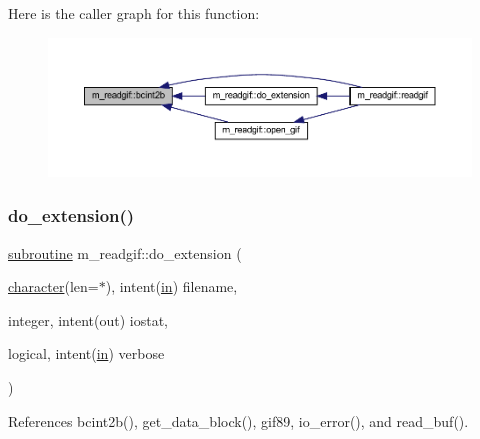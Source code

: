 Here is the caller graph for this function\+:
\nopagebreak
\begin{figure}[H]
\begin{center}
\leavevmode
\includegraphics[width=350pt]{namespacem__readgif_a38594ce718f97f844771250edcd5e496_icgraph}
\end{center}
\end{figure}
\mbox{\label{namespacem__readgif_a93c5f69ee5054ba2c10ed17b8ab53f6b}} 
\subsubsection{\texorpdfstring{do\+\_\+extension()}{do\_extension()}}
{\footnotesize\ttfamily \hyperlink{M__stopwatch_83_8txt_acfbcff50169d691ff02d4a123ed70482}{subroutine} m\+\_\+readgif\+::do\+\_\+extension (\begin{DoxyParamCaption}\item[{\hyperlink{option__stopwatch_83_8txt_abd4b21fbbd175834027b5224bfe97e66}{character}(len=$\ast$), intent(\hyperlink{M__journal_83_8txt_afce72651d1eed785a2132bee863b2f38}{in})}]{filename,  }\item[{integer, intent(out)}]{iostat,  }\item[{logical, intent(\hyperlink{M__journal_83_8txt_afce72651d1eed785a2132bee863b2f38}{in})}]{verbose }\end{DoxyParamCaption})\hspace{0.3cm}{\ttfamily [private]}}



References bcint2b(), get\+\_\+data\+\_\+block(), gif89, io\+\_\+error(), and read\+\_\+buf().

